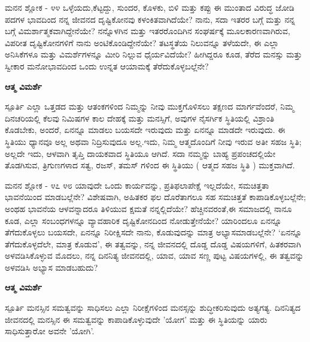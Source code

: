 \begin{mananam}{\mananamfont \large ಮನನ ಶ್ಲೋಕ - ೪೪}
\footnotesize \mananamtext ಒಳ್ಳೆಯದು,ಕೆಟ್ಟದ್ದು, ಸುಂದರ, ಕೊಳಕು, ಬಿಳಿ ಮತ್ತು ಕಪ್ಪು ಈ ಮುಂತಾದ ವಿರುದ್ಧ ಜೋಡಿ ಪದಗಳ ಭಾವದಿಂದ ನನ್ನ ಜೀವನದ ದೃಷ್ಟಿಕೋನವು ಕಳಂಕಿತವಾಗಿದೆಯೇ? ನಾನು, ಸದಾ ಇತರರ ಬಗ್ಗೆ ಮತ್ತು ನನ್ನ ಬಗ್ಗೆ ವಿಮರ್ಶಾತ್ಮಕವಾಗಿದ್ದೇನೆಯೇ? ನನ್ನೊಳಗಿನ ಮತ್ತು ಇತರರೊಂದಿಗಿನ  ಸಂಘರ್ಷಕ್ಕೆ ಮೂಲಕಾರಣವಾಗಿರುವ, ವಿಪರೀತ ದೃಷ್ಟಿಕೋನಗಳಿಗೆ ನಾನು ಅಂಟಿಕೊಂಡಿದ್ದೇನೆಯೇ? ತಟಸ್ಥತೆಯ ನಿಲುವನ್ನೂ ತಳೆಯದೇ, ಈ ಎಲ್ಲಾ ಅನಿಸಿಕೆಗಳೂ ಮತ್ತು ವಿಮರ್ಶೆಗಳನ್ನೂ ಮೀರಿ ನಿಲ್ಲುವ ಧೈರ್ಯವಿದೆಯೇ? ಹೀಗಿದ್ದರೂ ಕೂಡ,  ತೆರೆದ ಮನಸ್ಸು ಮತ್ತು ಸ್ವೀಕಾರ ಮನೋಭಾವದಿಂದ ಒಂದು ಉನ್ನತ ಆಯಾಮಕ್ಕೆ ತೆರೆದುಕೊಳ್ಳಬಲ್ಲೆನೇ?
\end{mananam}
\WritingHand\enspace\textbf{ಆತ್ಮ ವಿಮರ್ಶೆ}
\begin{inspiration}{\mananamfont \large ಸ್ಪೂರ್ತಿ}
\footnotesize \mananamtext ಎಲ್ಲಾ ಒತ್ತಡದ ಮತ್ತು ಆತಂಕಗಳಿಂದ ನಿಮ್ಮನ್ನು ನೀವು ಮುಕ್ತಗೊಳಿಸಲು ತಕ್ಷಣದ ಮಾರ್ಗವೆಂದರೆ, ನಿಮ್ಮ ದಿನಚರಿಯಲ್ಲಿ ಕೆಲವು ನಿಮಿಷಗಳ ಕಾಲ ದೇಹಕ್ಕೆ ಮತ್ತು ಮನಸ್ಸಿಗೆ, ಅವುಗಳ ನೈಸರ್ಗಿಕ ಸ್ಥಿತಿಯಲ್ಲಿ ವಿಶ್ರಾಂತಿ ಕೊಡಬೇಕು,  ಅಂದರೆ,  ಏನನ್ನೂ ಮಾಡಲು ಬಯಸದೇ ಇರುವುದು ಮತ್ತು ಏನನ್ನೂ ಮಾಡದೇ ಇರುವುದು. ಈ ಸ್ಥಿತಿಯು ಧ್ಯಾನವೂ ಅಲ್ಲ ಅಥವಾ ನಿದ್ರಿಸುವುದೂ ಅಲ್ಲ.ಇದು, ನಿಮ್ಮ ಆತ್ಮದೊಂದಿಗೆ ನೀವು ಇರುವ ಅತೀ ಸಹಜ ಸ್ಥಿತಿ;   ಅಲ್ಲದೇ ಇದು, ಆಳವಾಗಿ ತೃಪ್ತಿ ದಾಯಕವಾದ ಸ್ಥಿತಿಯೂ ಆಗಿದೆ. ಸದಾ ನಮ್ಮನ್ನು ಬಾಹ್ಯ ಪ್ರಪಂಚದಲ್ಲಿಯೇ ತೊಡಗಿಸುವ, ತ್ರಿಗುಣಗಳಾದ ಸತ್ವ, ರಜಸ್, ತಮಸ್ ಗಳಿಂದ ಈ ಸ್ಥಿತಿಯು ( ಆತ್ಮದ ಸಹಜ ಸ್ಥಿತಿ ) ಮುಕ್ತವಾಗಿದೆ. 
\end{inspiration}
\newpage


\newpage
\begin{mananam}{\mananamfont \large{ಮನನ ಶ್ಲೋಕ - ೪೭ ೪೮}}
\footnotesize \mananamtext ಯಾವುದೇ ಒಂದು ಕಾರ್ಯವನ್ನು, ಪ್ರತಿಫಲಾಪೇಕ್ಷೆ ಇಲ್ಲದೆಯೇ, ಸಮಚಿತ್ತತಾ ಭಾವನೆಯಿಂದ  ಮಾಡಬಲ್ಲೆನೇ? ವಿಶೇಷವಾಗಿ,  ಅಹಿತಕರ ಫಲ ದೊರೆತಾಗಲೂ ಸಹ ಸಮಚಿತ್ತತೆ ಕಾಪಾಡಿಕೊಳ್ಳಬಲ್ಲೆನೇ; ಅಂಥಹ ಭಾವನೆಯ ಆಳವನ್ನಾದರೂ ತಿಳಿಯುವ ಕ್ಷಮತೆ ನನ್ನಲ್ಲಿದೆಯೇ? ಹೆಚ್ಚಿನವರಂತೆ,ಈ ಸಮಾಜದಲ್ಲಿ ನಾನೂ ಕೂಡ, ಎಲ್ಲಾ ಸಂಬಂಧಗಳನ್ನೂ ವ್ಯಾವಹಾರಿಕ ದೃಷ್ಟಿಕೋನದಿಂದ ನೋಡುತ್ತೇನೆಯೇ? ಯಾರಿಂದಲೂ ಏನನ್ನೂ ತೆಗೆದುಕೊಳ್ಳಲು ಬಯಸದೇ, ಏನನ್ನೂ ನಿರೀಕ್ಷಿಸದೇ ನಾನು,  ಕೊಡುವುದನ್ನು ಮಾತ್ರ ಅಭ್ಯಾಸಮಾಡಬಲ್ಲೆನೇ? ‘ಏನನ್ನೂ ತೆಗೆದುಕೊಳ್ಳದೆಲೇ, ಮಾತ್ರ ಕೊಡುವ’, ಈ ತತ್ವವನ್ನು, ನನ್ನ ಜೀವನದಲ್ಲಿ ದೊಡ್ಡ ದೊಡ್ಡ ವಿಷಯಗಳಿಗೆ, ಹಿತಕರವಾಗಿ ಅಳವಡಿಸಿಕೊಳ್ಳುವ  ಮೊದಲು, ನನ್ನ ದಿನನಿತ್ಯ ಜೀವನದಲ್ಲಿ, ಯಾವ, ಯಾವ ಸಣ್ಣ ಪುಟ್ಟ ವಿಷಯಗಳಲ್ಲಿ, ಈ ತತ್ವವನ್ನು ಅಳವಡಿಸಿ ಅಭ್ಯಾಸ ಮಾಡಬಹುದು? 
\end{mananam}
\WritingHand\enspace\textbf{ಆತ್ಮ ವಿಮರ್ಶೆ}
\begin{inspiration}{\mananamfont \large ಸ್ಪೂರ್ತಿ}
\footnotesize \mananamtext ಮನಸ್ಸಿನ ಸಮತ್ವವನ್ನು ಸಾಧಿಸಲು ಎಲ್ಲಾ ನಿರೀಕ್ಷೆಗಳಿಂದ ಮನಸ್ಸನ್ನು ಶುದ್ಧೀಕರಿಸುವುದು ಅತ್ಯಗತ್ಯ. ದಿನನಿತ್ಯದ ಜೀವನದಲ್ಲಿ ಮನಸ್ಸಿನ ಈ ಸಮತ್ವವನ್ನು ಕಾಪಾಡಿಕೊಳ್ಳುವುದೇ 'ಯೋಗ' ಮತ್ತು ಈ ಸ್ಥಿತಿಯನ್ನು ಯಾರು ಸಾಧಿಸುತ್ತಾರೋ ಅವನೇ 'ಯೋಗಿ'.
\end{inspiration}
\newpage

